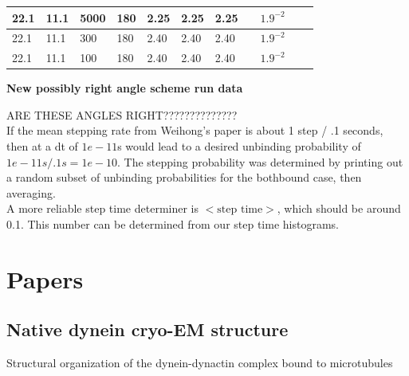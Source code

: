 \documentclass[10pt]{article} %
\begin{document}
\begin{center}
\begin{tabular}{| l | l | l | l | l | l | l | p{3cm} | p{2cm} | l | p{5cm} |}
    22.1 & 11.1 & 5000 &  180 & 2.25 & 2.25 & 2.25 & & $1.9^{-2}$ & & \\\hline
    22.1 & 11.1 & 300 &  180 & 2.40 & 2.40 & 2.40 & & $1.9^{-2}$ & & \\\hline
    22.1 & 11.1 & 100 &  180 & 2.40 & 2.40 & 2.40 & & $1.9^{-2}$ & & \\\hline
  \end{tabular}
  \textbf{New possibly right angle scheme run data}
\end{center}

ARE THESE ANGLES RIGHT??????????????\\

If the mean stepping rate from Weihong's paper is about 1 step / .1 seconds, then at a dt of $1e-11$s would lead to a desired unbinding
probability of $1e-11s/.1s = 1e-10$. The stepping probability was determined by printing out a random subset of unbinding probabilities
for the bothbound case, then averaging.\\

A more reliable step time determiner is $\Big<\mbox{step time}\Big>$, which should be around 0.1. This number can be determined from our step time histograms.\\

\section{Papers}
\subsection{Native dynein cryo-EM structure}
Structural organization of the dynein-dynactin complex bound to microtubules\\
\end{document}
